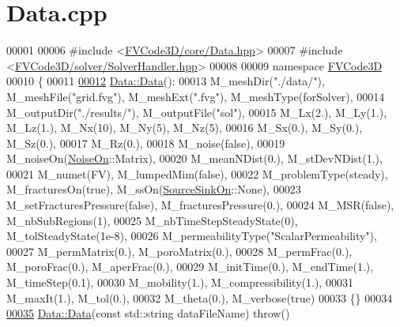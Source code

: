 \hypertarget{Data_8cpp_source}{}\section{Data.\+cpp}
\label{Data_8cpp_source}

\begin{DoxyCode}
00001 
00006 \textcolor{preprocessor}{#include <\hyperlink{Data_8hpp}{FVCode3D/core/Data.hpp}>}
00007 \textcolor{preprocessor}{#include <\hyperlink{SolverHandler_8hpp}{FVCode3D/solver/SolverHandler.hpp}>}
00008 
00009 \textcolor{keyword}{namespace }\hyperlink{namespaceFVCode3D}{FVCode3D}
00010 \{
00011 
\hypertarget{Data_8cpp_source.tex_l00012}{}\hyperlink{classFVCode3D_1_1Data_a2ab9e8e8f490af55c7d78163dfdb000c}{00012} \hyperlink{classFVCode3D_1_1Data_a2ab9e8e8f490af55c7d78163dfdb000c}{Data::Data}():
00013     M\_meshDir(\textcolor{stringliteral}{"./data/"}), M\_meshFile(\textcolor{stringliteral}{"grid.fvg"}), M\_meshExt(\textcolor{stringliteral}{".fvg"}), M\_meshType(forSolver),
00014     M\_outputDir(\textcolor{stringliteral}{"./results/"}), M\_outputFile(\textcolor{stringliteral}{"sol"}),
00015     M\_Lx(2.), M\_Ly(1.), M\_Lz(1.), M\_Nx(10), M\_Ny(5), M\_Nz(5),
00016     M\_Sx(0.), M\_Sy(0.), M\_Sz(0.),
00017     M\_Rz(0.),
00018     M\_noise(false),
00019     M\_noiseOn(\hyperlink{classFVCode3D_1_1Data_a983fdc14aa355a7c9fd614b9655a3552}{NoiseOn}::Matrix),
00020     M\_meanNDist(0.), M\_stDevNDist(1.),
00021     M\_numet(FV), M\_lumpedMim(false),
00022     M\_problemType(steady), M\_fracturesOn(true), M\_ssOn(\hyperlink{classFVCode3D_1_1Data_a4d66e2e205b350cb240820540339e1a3}{SourceSinkOn}::None),
00023     M\_setFracturesPressure(false), M\_fracturesPressure(0.),
00024     M\_MSR(false), M\_nbSubRegions(1),
00025     M\_nbTimeStepSteadyState(0), M\_tolSteadyState(1e-8),
00026     M\_permeabilityType(\textcolor{stringliteral}{"ScalarPermeability"}),
00027     M\_permMatrix(0.), M\_poroMatrix(0.),
00028     M\_permFrac(0.), M\_poroFrac(0.), M\_aperFrac(0.),
00029     M\_initTime(0.), M\_endTime(1.), M\_timeStep(0.1),
00030     M\_mobility(1.), M\_compressibility(1.),
00031     M\_maxIt(1.), M\_tol(0.),
00032     M\_theta(0.), M\_verbose(true)
00033 \{\}
00034 
\hypertarget{Data_8cpp_source.tex_l00035}{}\hyperlink{classFVCode3D_1_1Data_ae898de2278e74386b4dbab3a8be89ca9}{00035} \hyperlink{classFVCode3D_1_1Data_a2ab9e8e8f490af55c7d78163dfdb000c}{Data::Data}(\textcolor{keyword}{const} std::string dataFileName) \textcolor{keywordflow}{throw}()

\end{DoxyCode}
